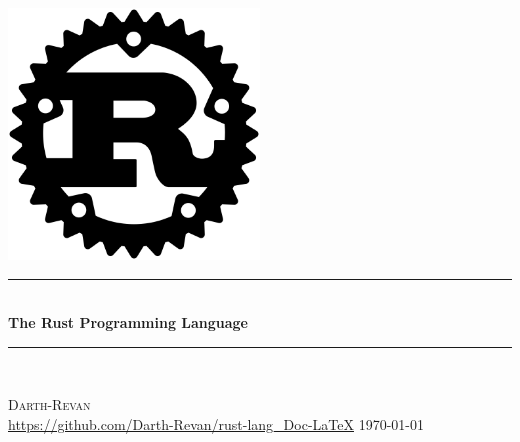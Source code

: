 \begin{titlepage}
\begin{center}

\vspace{1.5cm}
\includegraphics[width=0.5\textwidth]{src/Rust_Logo.png}\\[1cm]

\newcommand{\HRule}{\rule{\linewidth}{0.5mm}}

\HRule\\[1cm]
{\huge \bfseries The Rust Programming Language}\\[1cm]
\HRule\\
\vspace{3cm}

{\large
\textsc{Darth-Revan}\\[0.3cm]
\url{https://github.com/Darth-Revan/rust-lang_Doc-LaTeX}
}
\vfill
{\large \today}


\end{center}
\end{titlepage}
